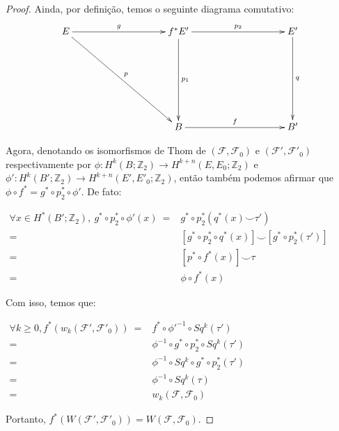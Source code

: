 \documentclass[12pt,oneside]{book} %
\newcommand{\Z}{\mathbb{Z}}
\newcommand{\ccup}{\smile}
\begin{document}
\begin{proof}
	\par Ainda, por definição, temos o seguinte diagrama comutativo:
	$$ \xymatrix @C=0.5cm {
		E \ar[rrrrr]^-{g} \ar[rrrrrddd]^-{p} &&&&& f^{*}E' \ar[rrrrr]^-{p_{2}} \ar[ddd]^-{p_{1}} &&&&& E' \ar[ddd]^-{q} \\
		&&&&& &&&&& \\
		&&&&& &&&&& \\
		&&&&& B \ar[rrrrr]^-{f} &&&&& B'
	} $$
	
	\par Agora, denotando os isomorfismos de Thom de $(\mathcal{F},\mathcal{F}_{0})$ e $(\mathcal{F'},\mathcal{F'}_{0})$ respectivamente por $\phi:H^{k}(B;\Z_{2})\to H^{k+n}(E,E_{0};\Z_{2})$ e $\phi':H^{k}(B';\Z_{2})\to H^{k+n}(E',E'_{0};\Z_{2})$, então também podemos afirmar que $\phi\circ f^{*}=g^{*}\circ p_{2}^{*}\circ\phi'$. De fato: \newline
	
	$\begin{array}{rl}
		\forall x\in H^{*}(B';\Z_{2}), \ g^{*}\circ p_{2}^{*}\circ\phi'(x) \ = & g^{*}\circ p_{2}^{*}(q^{*}(x)\ccup \tau') \\
		= & [g^{*}\circ p_{2}^{*}\circ q^{*}(x)]\ccup [g^{*}\circ p_{2}^{*}(\tau')] \\
		= & [p^{*}\circ f^{*}(x)]\ccup \tau \\
		= & \phi\circ f^{*}(x)
	\end{array}$ \newline
	
	\par Com isso, temos que: \newline
	
	$\begin{array}{rl}
		\forall k\geq 0, f^{*}(w_{k}(\mathcal{F'},\mathcal{F'}_{0})) \ = & f^{*}\circ\phi'^{-1}\circ Sq^{k}(\tau') \\
		= & \phi^{-1}\circ g^{*}\circ p_{2}^{*}\circ Sq^{k}(\tau') \\
		= & \phi^{-1}\circ Sq^{k}\circ g^{*}\circ p_{2}^{*}(\tau') \\
		= & \phi^{-1}\circ Sq^{k}(\tau) \\
		= & w_{k}(\mathcal{F},\mathcal{F}_{0})
	\end{array}$ \newline
	
	\par Portanto, $f^{*}(W(\mathcal{F'},\mathcal{F'}_{0}))=W(\mathcal{F},\mathcal{F}_{0})$.
	
\end{proof}
\end{document}
